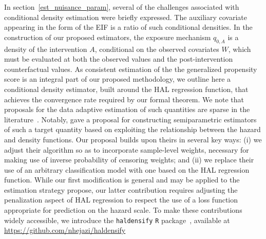 In section~\ref{est_nuisance_param}, several of the challenges associated
with conditional density estimation were briefly expressed. The auxiliary
covariate appearing in the form of the EIF is a ratio of such conditional
densities. In the construction of our proposed estimators, the exposure
mechanism $q_{0,A}$ is a density of the intervention $A$, conditional on the
observed covariates $W$, which must be evaluated at both the observed values and
the post-intervention counterfactual values. As consistent estimation of the the
generalized propensity score is an integral part of our proposed methodology, we
outline here a conditional density estimator, built around the HAL regression
function, that achieves the convergence rate required by our formal theorem. We
note that proposals for the data adaptive estimation of such quantities are
sparse in the literature~\citep[e.g.,][]{zhu2015boosting}. Notably,
\citet{diaz2011super} gave a proposal for constructing semiparametric estimators
of such a target quantity based on exploiting the relationship between the
hazard and density functions. Our proposal builds upon theirs in several key
ways: (i) we adjust their algorithm so as to incorporate sample-level weights,
necessary for making use of inverse probability of censoring weights; and (ii)
we replace their use of an arbitrary classification model with one based on the
HAL regression function. While our first modification is general and may be
applied to the estimation strategy \citet{diaz2011super} propose, our latter
contribution requires adjusting the penalization aspect of HAL regression to
respect the use of a loss function appropriate for prediction on the hazard
scale. To make these contributions widely accessible, we introduce the
\texttt{haldensify} \texttt{R} package~\citep{hejazi2020haldensify}, available
at \url{https://github.com/nhejazi/haldensify}

